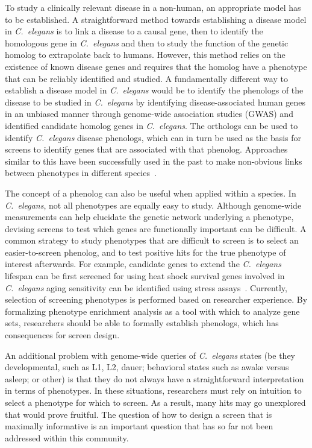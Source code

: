 \documentclass[10pt,letterpaper,twocolumn]{article}
\newcommand{\cel}{\emph{C.~elegans}}
\begin{document}
To study a clinically relevant disease in a non-human, an appropriate
model has to be established. A straightforward method towards establishing a
disease model in
\cel{} is to link a disease to a causal gene, then to identify the homologous
gene in \cel{} and then to study the function of the genetic homolog to
extrapolate back to humans. However, this method relies on the existence of
known disease genes and requires that the homolog have a phenotype that can be
reliably identified and studied. A fundamentally different way to establish a
disease model in \cel{} would be to identify the phenologs of the disease to be
studied in \cel{} by identifying disease-associated human genes in an unbiased
manner through genome-wide association studies (GWAS) and identified candidate
homolog genes in \cel{}. The orthologs can be used to identify \cel{} disease
phenologs, which can in turn be used as the basis for screens to identify
genes that are associated with that phenolog. Approaches similar to this have
been successfully used in the past to make non-obvious links between phenotypes
in different species~\cite{McGary2010}.

The concept of a phenolog can also be useful when applied within a species.
In \cel{}, not all phenotypes are equally easy to study. Although genome-wide
measurements can help elucidate the genetic network underlying a phenotype,
devising screens to test which genes are functionally important can be difficult.
A common strategy to study phenotypes that are difficult to screen is to
select an easier-to-screen phenolog, and to test positive hits for the true
phenotype of interest afterwards. For example, candidate genes to extend the \cel{}
lifespan can be first screened for using heat shock survival
genes involved in \cel{} aging
sensitivity can be identified using stress assays~\cite{Kim2007a,Mehta2009}.
Currently, selection of screening phenotypes is performed based on researcher
experience. By formalizing phenotype enrichment analysis as a tool with which to
analyze gene sets, researchers should be able to formally establish phenologs,
which has consequences for screen design.

An additional problem with genome-wide
queries of \cel{} states (be they developmental, such as
L1, L2, dauer; behavioral states such as awake versus asleep; or other) is that
they do not
always have a straightforward interpretation in terms of phenotypes. In these
situations, researchers must rely on intuition to select a phenotype for which to
screen. As a result, many hits may go unexplored that would prove fruitful. The
question of how to design a screen that is maximally informative is an important
question that has so far not been addressed within this community.
\end{document}
